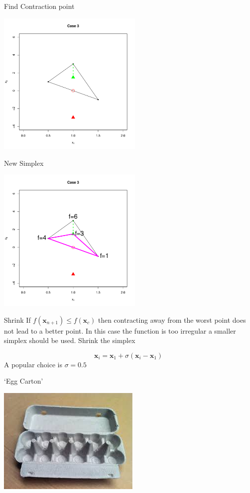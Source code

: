 \documentclass[10pt]{beamer}
\begin{document}
\begin{frame}{Find Contraction point}
  \begin{center}
    \includegraphics[height=7cm]{RCode/nmcontraction2.pdf}
  \end{center}
\end{frame}
\begin{frame}{New Simplex}
  \begin{center}
    \includegraphics[height=7cm]{RCode/nmcontraction3.pdf}
  \end{center}
\end{frame}
\begin{frame}{Shrink}
  If $f({\bm x_{n+1}})\leq f({\bm x_{c}})$ then contracting away from the worst point does not lead to a better point.  In this case the function is too irregular a smaller simplex should be used.  Shrink the simplex

  \begin{equation}
    {\bm x_i}={\bm x_1}+\sigma({\bm x_i}-{\bm x_1})
  \end{equation}
  A popular choice is $\sigma=0.5$
\end{frame}
\begin{frame}{`Egg Carton'}
  \begin{center}
    \includegraphics{eggcarton.jpeg}
  \end{center}
\end{frame}
\end{document}

